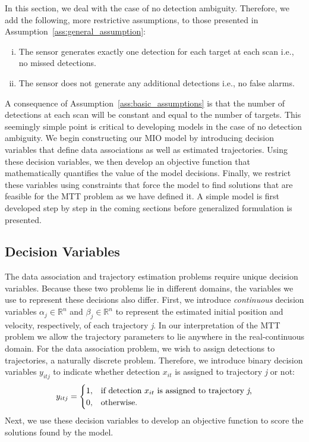 In this section, we deal with the case of no detection ambiguity. Therefore, we add the following, more restrictive assumptions, to those presented in Assumption~\ref{ass:general_assumption}:

\begin{assumption}\label{ass:basic_assumptions}
\leavevmode
\begin{enumerate}[(i)]
\item The sensor generates exactly one detection for each target
 at each scan i.e., no missed detections.
\item The sensor does not generate any additional detections
i.e., no false alarms.
\end{enumerate}
\end{assumption}
A consequence of Assumption~\ref{ass:basic_assumptions} is that the number of detections at each scan will be constant and equal to the number of targets. This seemingly simple point is critical to developing models in the case of no detection ambiguity. We begin constructing our MIO model by introducing decision variables that define data associations as well as estimated trajectories. Using these decision variables, we then develop an objective function that  mathematically quantifies the value of the model decisions. Finally, we restrict these variables using constraints that force the model to find solutions that are feasible for the MTT problem as we have defined it. A simple model is first developed step by step in the coming sections before generalized formulation is presented. 

\subsection{Decision Variables}
The data association and trajectory estimation problems require unique decision variables. Because these two problems lie in different domains, the variables we use to represent these decisions also differ. First, we introduce \textit{continuous} decision variables $\alpha_{j} \in \mathbb{R}^n$ and $\beta_{j} \in \mathbb{R}^n$ to represent the estimated initial position and velocity, respectively, of each trajectory \textit{j}. In our interpretation of the MTT problem we allow the trajectory parameters to lie anywhere in the real-continuous domain. For the data association problem, we wish to assign detections to trajectories, a naturally discrete problem. Therefore, we introduce binary decision variables $y_{itj}$ to indicate whether detection $x_{it}$ is assigned to trajectory \textit{j} or not:
\begin{align}
y_{itj} =
\begin{cases}
1, & \text{if detection $x_{it}$ is assigned to trajectory \textit{j},} \\
0, & \text{otherwise.}
\end{cases}
\end{align}
Next, we use these decision variables to develop an objective function to score the solutions found by the model. 


